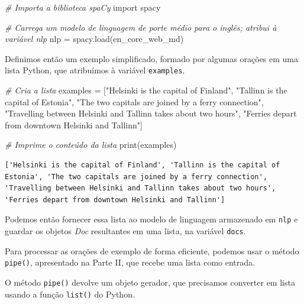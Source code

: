\documentclass[
  brazilian,
]{article}
\newenvironment{Shaded}{}{}
\newcommand{\BuiltInTok}[1]{#1}
\newcommand{\CommentTok}[1]{\textcolor[rgb]{0.38,0.63,0.69}{\textit{#1}}}
\newcommand{\ImportTok}[1]{#1}
\newcommand{\NormalTok}[1]{#1}
\newcommand{\OperatorTok}[1]{\textcolor[rgb]{0.40,0.40,0.40}{#1}}
\newcommand{\StringTok}[1]{\textcolor[rgb]{0.25,0.44,0.63}{#1}}
\begin{document}
\begin{Shaded}
\begin{Highlighting}[]
\CommentTok{\# Importa a biblioteca spaCy}
\ImportTok{import}\NormalTok{ spacy}

\CommentTok{\# Carrega um modelo de linguagem de porte médio para o inglês; atribui à variável \textquotesingle{}nlp\textquotesingle{}}
\NormalTok{nlp }\OperatorTok{=}\NormalTok{ spacy.load(}\StringTok{\textquotesingle{}en\_core\_web\_md\textquotesingle{}}\NormalTok{)}
\end{Highlighting}
\end{Shaded}

Definimos então um exemplo simplificado, formado por algumas orações em
uma lista Python, que atribuímos à variável \texttt{examples}.

\begin{Shaded}
\begin{Highlighting}[]
\CommentTok{\# Cria a lista}
\NormalTok{examples }\OperatorTok{=}\NormalTok{ [}\StringTok{"Helsinki is the capital of Finland"}\NormalTok{,}
            \StringTok{"Tallinn is the capital of Estonia"}\NormalTok{,}
            \StringTok{"The two capitals are joined by a ferry connection"}\NormalTok{,}
            \StringTok{"Travelling between Helsinki and Tallinn takes about two hours"}\NormalTok{,}
            \StringTok{"Ferries depart from downtown Helsinki and Tallinn"}\NormalTok{]}

\CommentTok{\# Imprime o conteúdo da lista}
\BuiltInTok{print}\NormalTok{(examples)}
\end{Highlighting}
\end{Shaded}

\begin{verbatim}
['Helsinki is the capital of Finland', 'Tallinn is the capital of Estonia', 'The two capitals are joined by a ferry connection', 'Travelling between Helsinki and Tallinn takes about two hours', 'Ferries depart from downtown Helsinki and Tallinn']
\end{verbatim}

Podemos então fornecer essa lista ao modelo de linguagem armazenado em
\texttt{nlp} e guardar os objetos \emph{Doc} resultantes em uma lista,
na variável \texttt{docs}.

Para processar as orações de exemplo de forma eficiente, podemos usar o
método \texttt{pipe()}, apresentado na Parte II, que recebe uma lista
como entrada.

O método \texttt{pipe()} devolve um objeto gerador, que precisamos
converter em lista usando a função \texttt{list()} do Python.
\end{document}
